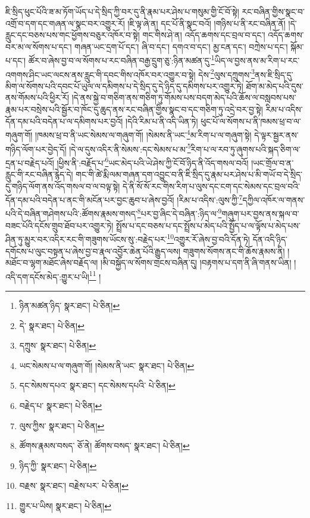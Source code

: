 ཇི་སྲིད་ཕུང་པོའི་ཟ་མ་ཏོག་ཡོད་པ་དེ་སྲིད་ཀྱི་བར་དུ་ནི་རྣམ་པར་ཤེས་པ་གསུམ་གྱི་ངོ་བོ་སྟེ། རང་བཞིན་གྱིས་སྣང་བ་འགྲོ་བ་དག་དང་གཞན་ལ་སྣང་བར་འགྱུར་རོ། །ཇི་ལྟ་ཞེ་ན། དང་པོ་ནི་སྣང་བའོ། །གཉིས་པ་ནི་རང་བཞིན་ནོ། །དེ་རླུང་དང་བཅས་པས་གང་ཕྱོགས་བཅུར་འཁོར་བ་སྟེ། གང་གིས་ཤེ་ན། འདོད་ཆགས་དང་བྲལ་བ་དང་། འདོད་ཆགས་བར་མ་ལ་སོགས་པ་དང་། གཞན་ཡང་དྲག་པོ་དང་། ཞི་བ་དང་། དགའ་བ་དང་། མྱ་ངན་དང་། བཀྲེས་པ་དང་། སྐོམ་པ་དང་། ཚོར་བ་ཞེས་བྱ་བ་ལ་སོགས་པ་རང་བཞིན་བརྒྱ་དྲུག་ཅུ་:ཉིན་མཚན་དུ་\footnote{ཉིན་མཚན་ཉིད་  སྣར་ཐང་།  པེ་ཅིན། }ཡིད་ལ་བྱས་ནས་མ་རིག་པ་རང་འགགས་ཤིང་ཡང་ལངས་ནས་རླུང་གི་དབང་གིས་འཁོར་བར་འགྱུར་བ་སྟེ། དེས་\footnote{དེ་  སྣར་ཐང་།  པེ་ཅིན། }ལུས་དཀྲུགས་\footnote{དཀྲུས་  སྣར་ཐང་།  པེ་ཅིན། }ནས་ཇི་སྲིད་དུ་མིག་ལ་སོགས་པའི་དབང་པོ་ཡུལ་ལ་དམིགས་པ་དེ་སྲིད་དུ་དེ་ཉིད་དུ་དམིགས་པར་འགྱུར་ཏེ། ཐོག་མ་མེད་པའི་དུས་ནས་གོམས་པའི་ཕྱིར་རོ། །དེ་ནས་སྐྱེ་བ་གཅིག་ནས་གཅིག་ཏུ་གོམས་པས་བདག་མེད་པའི་ཆོས་ལ་བསླབས་པས་རྣམ་པར་བསྲེས་པའི་སྦྱོར་བ་ཁོང་དུ་ཆུད་ནས་རང་བཞིན་གྱིས་སྣང་བ་དང་གཅིག་ཏུ་འདྲེ་བར་བྱ་སྟེ། རིམ་པ་འདིས་དོན་དམ་པའི་བདེན་པ་ལ་དམིགས་པར་བྱའོ། །དེའི་རིམ་པ་ནི་འདི་ཡིན་ཏེ། ཕུང་པོ་ལ་སོགས་པ་ནི་ཁམས་ཕྲ་བ་ལ་གཞུག་གོ། །ཁམས་ཕྲ་བ་ནི་ཡང་སེམས་ལ་གཞུག་གོ། །སེམས་ནི་ཡང་\footnote{ཡང་སེམས་པ་ལ་གཞུག་གོ། །སེམས་ནི་ཡང་  སྣར་ཐང་།  པེ་ཅིན། }མ་རིག་པ་ལ་གཞུག་སྟེ། དེ་ལྟར་སྦྱར་ནས་གཉིད་ལོག་པར་བྱེད་དོ། །དེ་ལ་དུས་འདིར་ནི་སེམས་:དང་སེམས་པ་མ་\footnote{དང་སེམས་དཔའ་  སྣར་ཐང་། དང་སེམས་དཔའི་  པེ་ཅིན། }རིག་པ་ལ་རབ་ཏུ་ཞུགས་པའི་སྐད་ཅིག་ལ་དྲན་པ་བརྗེད་པའོ། །ཕྱིས་ནི་:བརྗོད་པ་\footnote{བརྗེད་པ་  སྣར་ཐང་།  པེ་ཅིན། }ཡང་མེད་པའི་ཡེ་ཤེས་ཀྱི་ངོ་བོ་ཉིད་ནི་འོད་གསལ་བའོ། །ཡང་གྲོལ་བ་ན་རླུང་གི་རང་བཞིན་རྙེད་དེ། གང་གི་ཚེ་རྨི་ལམ་གཞན་དག་འབྱུང་བ་ནི་ཇི་སྲིད་དུ་རྣམ་པར་ཤེས་པ་མི་གཡོ་བ་དེ་སྲིད་དུ་གཉིད་ལོག་ནས་འོད་གསལ་བ་ལ་བལྟ་སྟེ། དེ་ནི་སོ་སོ་རང་གིས་རིག་པ་ལུས་དང་ངག་དང་སེམས་དང་བྲལ་བའི་དོན་དམ་པའི་བདེན་པ་ནང་གི་མངོན་པར་བྱང་ཆུབ་པ་ཞེས་བྱའོ། །རིམ་པ་འདིས་:ལུས་ཀྱི་\footnote{ལུས་ཀྱིས་  སྣར་ཐང་།  པེ་ཅིན། }དཀྱིལ་འཁོར་ལ་གནས་པའི་དེ་བཞིན་གཤེགས་པའི་:ཚོགས་རྣམས་གསད་\footnote{ཚོགས་རྣམས་བསད་  ཅོ་ནེ། ཚོགས་བསད་  སྣར་ཐང་།  པེ་ཅིན། }པར་བྱ་ཞིང་དེ་བཞིན་:ཉིད་ལ་\footnote{ཉིད་ཀྱི་  སྣར་ཐང་།  པེ་ཅིན། }གཞུག་པར་བྱས་ནས་སྐལ་བ་བཟང་པོའི་དངོས་གྲུབ་ཐོབ་པར་འགྱུར་ཏེ། སྤྲོས་པ་དང་བཅས་པ་དང་སྤྲོས་པ་མེད་པའི་སྤྱོད་པ་ལ་ལྟོས་པ་མེད་པས་ཤིན་ཏུ་མྱུར་བར་འདིར་རང་གི་གཟུགས་ཡོངས་སུ་:བརྗེད་པར་\footnote{བརྗས་  སྣར་ཐང་། བརྗེས་པར་  པེ་ཅིན། }འགྱུར་རོ་ཞེས་བྱ་བའི་དོན་ཏེ། དོན་འདི་ཉིད་དགོངས་པ་ལུང་བསྟན་པ་ཞེས་བྱ་བ་རྣལ་འབྱོར་ཆེན་པོའི་རྒྱུད་ལས། གཟུགས་སོགས་ནང་གི་ཆོས་རྣམས་ནི། །མཐོང་བ་ལྷག་མཐོང་ཞེས་བརྗོད་ལ། །མི་བསྐྱོད་ལ་སོགས་གྲངས་བཞིན་དུ། །བརྟགས་པ་དག་ནི་ཞི་གནས་ཡིན། །འདི་དག་དངོས་མེད་:གྱུར་པ་ཡི།\footnote{གྱུར་པ་ཡིས།  སྣར་ཐང་།  པེ་ཅིན། } །
